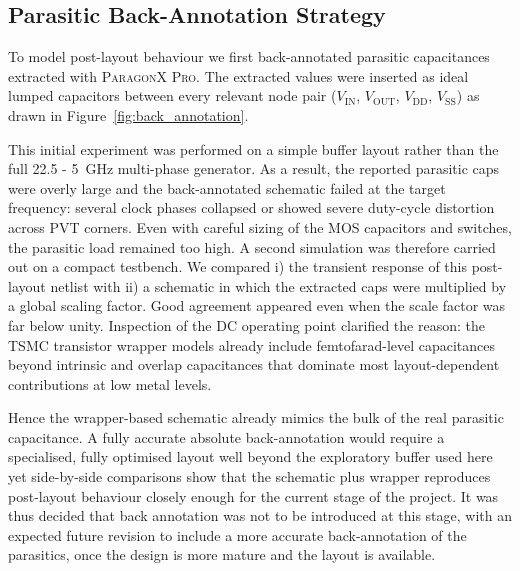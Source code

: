 \subsection{Parasitic Back-Annotation Strategy}

To model post-layout behaviour we first back-annotated parasitic capacitances extracted with \textsc{ParagonX Pro}.%
The extracted values were inserted as ideal lumped capacitors between every relevant node pair (\(V_\text{IN}\), \(V_\text{OUT}\), \(V_\text{DD}\), \(V_\text{SS}\)) as drawn in Figure~\ref{fig:back_annotation}.


This initial experiment was performed on a simple buffer layout rather than the full 22.5 - 5~GHz multi-phase generator.
As a result, the reported parasitic caps were overly large and the back-annotated schematic failed at the target frequency: several clock phases collapsed or showed severe duty-cycle distortion across PVT corners.
Even with careful sizing of the MOS capacitors and switches, the parasitic load remained too high.
A second simulation was therefore carried out on a compact testbench.  
We compared i) the transient response of this post-layout netlist with ii) a schematic in which the extracted caps were multiplied by a global scaling factor.  
Good agreement appeared even when the scale factor was far below unity.  
Inspection of the DC operating point clarified the reason: the TSMC transistor wrapper models already include femtofarad-level capacitances beyond intrinsic and overlap capacitances that dominate most layout-dependent contributions at low metal levels.

Hence the wrapper-based schematic already mimics the bulk of the real parasitic capacitance.  
A fully accurate absolute back-annotation would require a specialised, fully optimised layout well beyond the exploratory buffer used here yet side-by-side comparisons show that the schematic plus wrapper reproduces post-layout behaviour closely enough for the current stage of the project.
It was thus decided that back annotation was not to be introduced at this stage, with an expected future revision to include a more accurate back-annotation of the parasitics, once the design is more mature and the layout is available.


